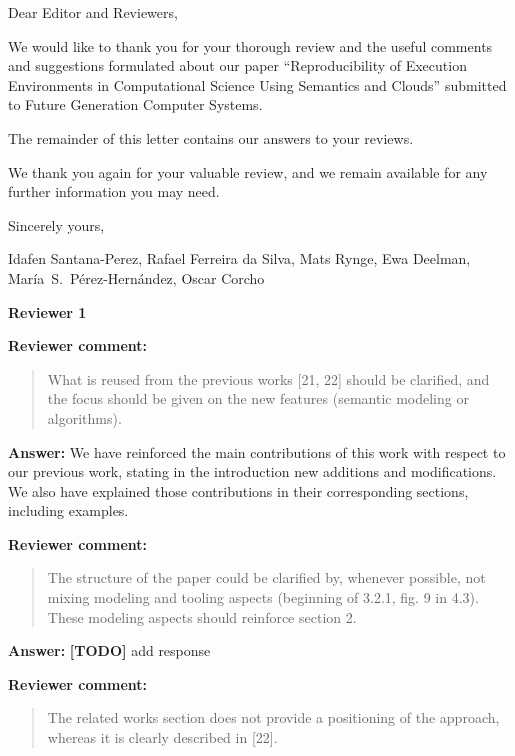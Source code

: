 \documentclass{letter}
\date{Aug 31, 2015}
\newenvironment{review}%
{\textbf{Reviewer comment:}\begin{quote}}%
{\end{quote}}%
\newcommand{\todo}[1]{%
      \color{red}\textbf{[TODO]} #1\color{black}}
\newcommand{\answer}[1]{%
      \textbf{Answer:} #1}
\newcommand{\revised}[1]{\emph{#1}\color{black}}
\begin{document}
\begin{letter}{}

\opening{Dear Editor and Reviewers,}

We would like to thank you for your thorough review and the useful
comments and suggestions formulated about our paper 
``Reproducibility of Execution Environments in Computational Science Using Semantics and Clouds'' 
submitted to Future Generation Computer Systems.

The remainder of this letter contains our answers to your reviews. 

We thank you again for your valuable review, and we remain available for any further information you may need.

\vspace{0.5cm}

Sincerely yours,

\vspace{1cm}

Idafen Santana-Perez, Rafael Ferreira da Silva, Mats Rynge, Ewa Deelman, Mar\'ia~S.~P\'erez-Hern\'andez, Oscar Corcho

\newpage


%
%
\textbf{Reviewer 1}


\begin{review}
What is reused from the previous works [21, 22] should be clarified, and the focus should be given on the new features (semantic modeling or algorithms).
\end{review}

\answer{We have reinforced the main contributions of this work with respect to our previous work, stating in the introduction new additions and modifications. We also have explained those contributions in their corresponding sections, including examples.}



\begin{review}
The structure of the paper could be clarified by, whenever possible, not mixing modeling and tooling aspects (beginning of 3.2.1, fig. 9 in 4.3). These modeling aspects should reinforce section 2.
\end{review}

\answer{\todo{add response}}


\begin{review}
The related works section does not provide a positioning of the approach, whereas it is clearly described in [22].
\end{review}


\end{letter}
\end{document}
